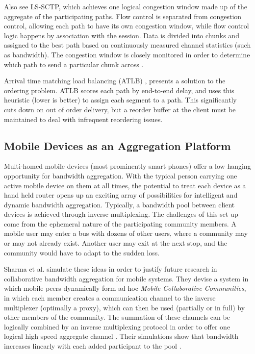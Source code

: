 \documentclass[12pt]{article}
\begin{document}
	Also see LS-SCTP, which achieves one logical congestion window made up of the aggregate of the participating paths. Flow control is separated from congestion control, allowing each path to have its own congestion window, while flow control logic happens by association with the session. Data is divided into chunks and assigned to the best path based on continuously measured channel statistics (such as bandwidth). The congestion window is closely monitored in order to determine which path to send a particular chunk across \cite{AbdElAl20041012}.

	Arrival time matching load balancing (ATLB) \cite{iguchi2005new}, presents a solution to the ordering problem. ATLB scores each path by end-to-end delay, and uses this heuristic (lower is better) to assign each segment to a path. This significantly cuts down on out of order delivery, but a reorder buffer at the client must be maintained to deal with infrequent reordering issues.

\subsection{Mobile Devices as an Aggregation Platform}

	Multi-homed mobile devices (most prominently smart phones) offer a low hanging opportunity for bandwidth aggregation. With the typical person carrying one active mobile device on them at all times, the potential to treat each device as a hand held router opens up an exciting array of possibilities for intelligent and dynamic bandwidth aggregation. Typically, a bandwidth pool between client devices is achieved through inverse multiplexing. The challenges of this set up come from the ephemeral nature of the participating community members. A mobile user may enter a bus with dozens of other users, where a community may or may not already exist. Another user may exit at the next stop, and the community would have to adapt to the sudden loss.

	Sharma et al. simulate these ideas in order to justify future research in collaborative bandwidth aggregation for mobile systems. They devise a system in which mobile peers dynamically form ad hoc {\it Mobile Collaborative Communities}, in which each member creates a communication channel to the inverse multiplexer (optimally a proxy), which can then be used (partially or in full) by other members of the community. The summation of these channels can be logically combined by an inverse multiplexing protocol in order to offer one logical high speed aggregate channel \cite{1363842}. Their simulations show that bandwidth increases linearly with each added participant to the pool \cite{1363842}.
\end{document}
